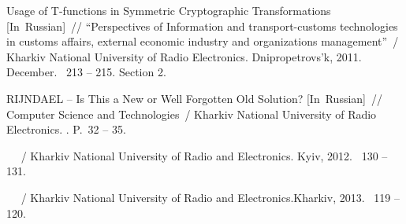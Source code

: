 \begin{thebibliography}{1}
 {Usage of T-functions in Symmetric
  Cryptographic Transformations [In~Russian]}~// {``Perspectives of Information
  and transport-customs technologies in customs affairs, external economic
  industry and organizations management''}~/ {Kharkiv National University of
  Radio Electronics}. \BibDash
\newblock Dnipropetrovs'k, 2011. \BibDash December. \BibDash
{}~213 -- 215. \BibDash
\newblock Section 2.

 {RIJNDAEL -- Is This a
  New or Well Forgotten Old Solution? [In~Russian]}~// {Computer Science and
  Technologies}~/ {Kharkiv National University of Radio Electronics}. \BibDash
{}. \BibDash
\newblock P.~32 -- 35.

~
~/
Kharkiv National University of Radio and Electronics. \BibDash Kyiv, 2012. ~130 -- 131.

 ~
~/
Kharkiv National University of Radio and Electronics.\BibDash Kharkiv, 2013. ~119 -- 120.

\end{thebibliography}
\endgroup
